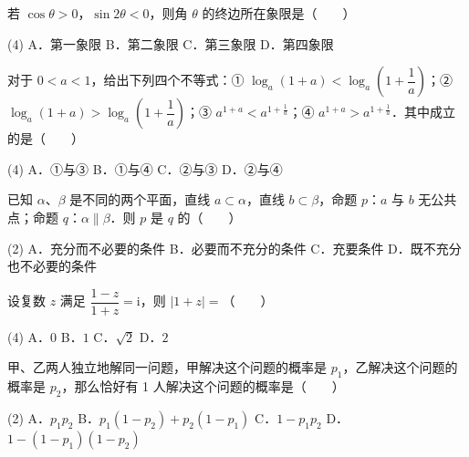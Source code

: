 

\begin{question}
若 $\cos\theta > 0$，$\sin 2\theta < 0$，则角 $\theta$ 的终边所在象限是\mbox{（　　）}

\begin{gkopts}(4)
\task A．第一象限
\task B．第二象限
\task C．第三象限
\task D．第四象限
\end{gkopts}

\end{question}
\begin{question}
对于 $0 < a < 1$，给出下列四个不等式：① $\log_a(1 + a) < \log_a\left(1 + \dfrac{1}{a}\right)$；② $\log_a(1 + a) > \log_a\left(1 + \dfrac{1}{a}\right)$；③ $a^{1+a} < a^{1+\frac{1}{a}}$；④ $a^{1+a} > a^{1+\frac{1}{a}}$．其中成立的是\mbox{（　　）}

\begin{gkopts}(4)
\task A．①与③
\task B．①与④
\task C．②与③
\task D．②与④
\end{gkopts}

\end{question}
\begin{question}
已知 $\alpha$、$\beta$ 是不同的两个平面，直线 $a \subset \alpha$，直线 $b \subset \beta$，命题 $p$：$a$ 与 $b$ 无公共点；命题 $q$：$\alpha \parallel \beta$．则 $p$ 是 $q$ 的\mbox{（　　）}

\begin{gkopts}(2)
\task A．充分而不必要的条件
\task B．必要而不充分的条件
\task C．充要条件
\task D．既不充分也不必要的条件
\end{gkopts}

\end{question}
\begin{question}
设复数 $z$ 满足 $\dfrac{1-z}{1+z} = \mathrm{i}$，则 $|1+z| =$\mbox{（　　）}

\begin{gkopts}(4)
\task A．$0$
\task B．$1$
\task C．$\sqrt{2}$
\task D．$2$
\end{gkopts}

\end{question}
\begin{question}
甲、乙两人独立地解同一问题，甲解决这个问题的概率是 $p_1$，乙解决这个问题的概率是 $p_2$，那么恰好有 1 人解决这个问题的概率是\mbox{（　　）}

\begin{gkopts}(2)
\task A．$p_1 p_2$
\task B．$p_1(1 - p_2) + p_2(1 - p_1)$
\task C．$1 - p_1 p_2$
\task D．$1 - (1 - p_1)(1 - p_2)$
\end{gkopts}

\end{question}
